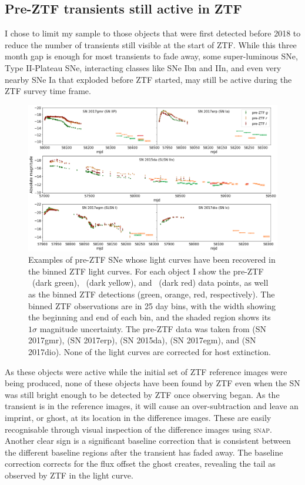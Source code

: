 \documentclass[a4paper,oneside,12pt, class=Latex/Classes/PhDthesisPSnPDF, crop=false]{standalone}
\begin{document}
\subsection{Pre-ZTF transients still active in ZTF}
\label{tails}
I chose to limit my sample to those objects that were first detected before 2018 to reduce the number of transients still visible at the start of ZTF. While this three month gap is enough for most transients to fade away, some super-luminous SNe, Type II-Plateau SNe, interacting classes like SNe Ibn and IIn, and even very nearby SNe Ia that exploded before ZTF started, may still be active during the ZTF survey time frame.

\begin{figure}
    \centering
    \includegraphics[width=\textwidth]{../Images/chapter_4/tails.png}
    \caption{Examples of pre-ZTF SNe whose light curves have been recovered in the binned ZTF light curves. For each object I show the pre-ZTF \ztfg~(dark green), \ztfr~(dark yellow), and \ztfi~(dark red) data points, as well as the binned ZTF detections (green, orange, red, respectively). The binned ZTF observations are in 25 day bins, with the width showing the beginning and end of each bin, and the shaded region shows its $1\sigma$ magnitude uncertainty. The pre-ZTF data was taken from \citet{2017gmr} (SN 2017gmr), \citet{2017erp} (SN 2017erp), \citet{2015da_2020} (SN 2015da), \citet{2017egm} (SN 2017egm), and \citet{2017dio} (SN 2017dio). None of the light curves are corrected for host extinction.}
    \label{tail-examples}
\end{figure}

As these objects were active while the initial set of ZTF reference images were being produced, none of these objects have been found by ZTF even when the SN was still bright enough to be detected by ZTF once observing began. As the transient is in the reference images, it will cause an over-subtraction and leave an imprint, or ghost, at its location in the difference images. These are easily recognisable through visual inspection of the difference images using \textsc{snap}. Another clear sign is a significant baseline correction that is consistent between the different baseline regions after the transient has faded away. The baseline correction corrects for the flux offset the ghost creates, revealing the tail as observed by ZTF in the light curve.
\end{document}
